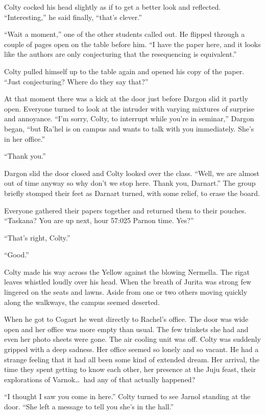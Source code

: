 Colty cocked his head slightly as if to get a better look and reflected. ``Interesting,'' he
said finally, ``that's clever.''

``Wait a moment,'' one of the other students called out. He flipped through a couple of pages
open on the table before him. ``I have the paper here, and it looks like the authors are only
conjecturing that the resequencing is equivalent.''

Colty pulled himself up to the table again and opened his copy of the paper. ``Just
conjecturing? Where do they say that?''

At that moment there was a kick at the door just before Dargon slid it partly open. Everyone
turned to look at the intruder with varying mixtures of surprise and annoyance. ``I'm sorry,
Colty, to interrupt while you're in seminar,'' Dargon began, ``but Ra'hel is on campus and wants
to talk with you immediately. She's in her office.''

``Thank you.''

Dargon slid the door closed and Colty looked over the class. ``Well, we are almost out of time
anyway so why don't we stop here. Thank you, Darnart.'' The group briefly stomped their feet as
Darnart turned, with some relief, to erase the board.

Everyone gathered their papers together and returned them to their pouches. ``Taskana? You are
up next, hour 57:025 Parnon time. Yes?''

``That's right, Colty.''

``Good.''

Colty made his way across the Yellow against the blowing Nermella. The rigat leaves whistled
loudly over his head. When the breath of Jurita was strong few lingered on the seats and lawns.
Aside from one or two others moving quickly along the walkways, the campus seemed deserted.

When he got to Cogart he went directly to Rachel's office. The door was wide open and her office
was more empty than usual. The few trinkets she had and even her photo sheets were gone. The air
cooling unit was off. Colty was suddenly gripped with a deep sadness. Her office seemed so
lonely and so vacant. He had a strange feeling that it had all been some kind of extended dream.
Her arrival, the time they spent getting to know each other, her presence at the Juju feast,
their explorations of Varnok\ldots\ had any of that actually happened?

``I thought I saw you come in here.'' Colty turned to see Jarnol standing at the door. ``She
left a message to tell you she's in the hall.''

